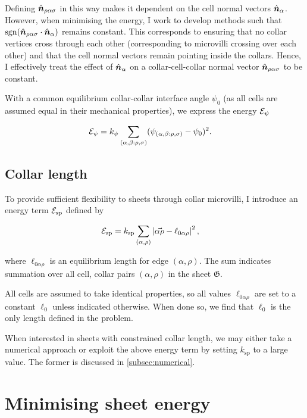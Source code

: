 Defining $\hat{\bm{n}}_{\rho\alpha\sigma}$ in this way makes it dependent on the cell normal vectors $\hat{\bm{n}}_\alpha$. 
However, when minimising the energy, I work to develop methods such that $\operatorname{sgn} (\hat{\bm{n}}_{\rho\alpha\sigma} \cdot \hat{\bm{n}}_\alpha)$ remains constant. 
This corresponds to ensuring that no collar vertices cross through each other (corresponding to microvilli crossing over each other) and that the cell normal vectors remain pointing inside the collars.
Hence, I effectively treat the effect of $\hat{\bm{n}}_\alpha$ on a collar-cell-collar normal vector $\hat{\bm{n}}_{\rho\alpha\sigma}$ to be constant.

With a common equilibrium collar-collar interface angle $\psi_0$ (as all cells are assumed equal in their mechanical properties), we express the energy $\mathcal{E}_\psi$ 

\begin{align}
	\mathcal{E}_\psi &= k_\psi \sum_{(\alpha, \beta: \rho, \sigma)} (\psi_{(\alpha, \beta: \rho, \sigma)} - \psi_0)^2. \label{eq:e_psi}
\end{align}

\subsection{Collar length}

To provide sufficient flexibility to sheets through collar microvilli, I introduce an energy term $\mathcal{E}_{\text{sp}}$ defined by 

\begin{align}
	\mathcal{E}_{\text{sp}} &= k_{\text{sp}} \sum_{(\alpha, \rho)} \left| \vec{\alpha\rho} - \ell_{0\alpha\rho} \right|^2, \label{eq:e_sp}
\end{align}

\noindent where $\ell_{0\alpha\rho}$ is an equilibrium length for edge $(\alpha, \rho)$. The sum indicates summation over all cell, collar pairs $(\alpha, \rho)$ in the sheet $\mathfrak{G}$.

All cells are assumed to take identical properties, so all values $\ell_{0\alpha\rho}$ are set to a constant $\ell_0$ unless indicated otherwise. When done so, we find that $\ell_0$ is the only length defined in the problem.

When interested in sheets with constrained collar length, we may either take a numerical approach or exploit the above energy term by setting $k_{\text{sp}}$ to a large value. The former is discussed in \cref{subsec:numerical}.


\section{Minimising sheet energy}

